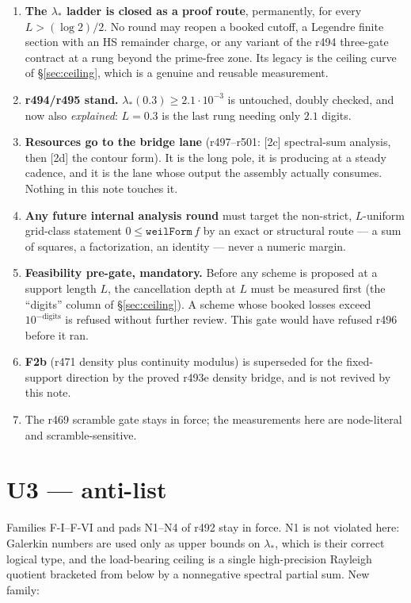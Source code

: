\documentclass[11pt]{article}
\theoremstyle{remark}
\begin{document}
\begin{enumerate}
\item \textbf{The $\lambda_*$ ladder is closed as a proof route},
permanently, for every $L>(\log2)/2$.  No round may reopen a booked
cutoff, a Legendre finite section with an HS remainder charge, or any
variant of the r494 three-gate contract at a rung beyond the
prime-free zone.  Its legacy is the ceiling curve of
\S\ref{sec:ceiling}, which is a genuine and reusable measurement.
\item \textbf{r494/r495 stand.} $\lambda_*(0.3)\ge2.1\cdot10^{-3}$ is
untouched, doubly checked, and now also \emph{explained}: $L=0.3$ is
the last rung needing only $2.1$ digits.
\item \textbf{Resources go to the bridge lane} (r497--r501: [2c]
spectral-sum analysis, then [2d] the contour form).  It is the long
pole, it is producing at a steady cadence, and it is the lane whose
output the assembly actually consumes.  Nothing in this note touches
it.
\item \textbf{Any future internal analysis round} must target the
non-strict, $L$-uniform grid-class statement
$0\le\texttt{weilForm}\,f$ by an exact or structural route --- a sum
of squares, a factorization, an identity --- never a numeric margin.
\item \textbf{Feasibility pre-gate, mandatory.} Before any scheme is
proposed at a support length $L$, the cancellation depth at $L$ must
be measured first (the ``digits'' column of \S\ref{sec:ceiling}).
A scheme whose booked losses exceed $10^{-\text{digits}}$ is refused
without further review.  This gate would have refused r496 before it
ran.
\item \textbf{F2b} (r471 density plus continuity modulus) is
superseded for the fixed-support direction by the proved r493e
density bridge, and is not revived by this note.
\item The r469 scramble gate stays in force; the measurements here are
node-literal and scramble-sensitive.
\end{enumerate}

\section{U3 --- anti-list}\label{sec:u3}

Families F-I--F-VI and pads N1--N4 of r492 stay in force.  N1 is not
violated here: Galerkin numbers are used only as upper bounds on
$\lambda_*$, which is their correct logical type, and the
load-bearing ceiling is a single high-precision Rayleigh quotient
bracketed from below by a nonnegative spectral partial sum.
New family:
\end{document}
